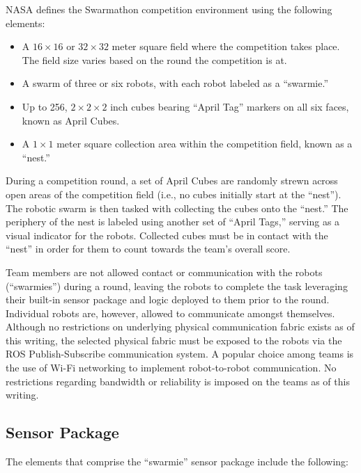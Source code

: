 \documentclass[sigconf,authordraft]{acmart}
\begin{document}
NASA defines the Swarmathon competition environment using the following
elements:

\begin{itemize}
  \item A $16 \times 16$ or $32 \times 32$ meter square field where the
  competition takes place. The field size varies based on the round the
  competition is at.
  \item A swarm of three or six robots, with each robot labeled as a
  ``swarmie.''
  \item Up to 256, $2 \times 2 \times 2$ inch cubes bearing ``April Tag''
  markers on all six faces, known as April Cubes.
  \item A $1 \times 1$ meter square collection area within the competition
  field, known as a ``nest.''
\end{itemize}

During a competition round, a set of April Cubes are randomly strewn across
open areas of the competition field (i.e., no cubes initially start at
the ``nest''). The robotic swarm is then tasked with collecting the cubes onto
the ``nest.'' The periphery of the nest is labeled using another set of ``April
Tags,'' serving as a visual indicator for the robots. Collected cubes must be
in contact with the ``nest'' in order for them to count towards the team's
overall score.

Team members are not allowed contact or communication with the robots
(``swarmies'') during a round, leaving the robots to complete the task
leveraging their built-in sensor package and logic deployed to them prior to the
round. Individual robots are, however, allowed to communicate amongst
themselves. Although no restrictions on underlying physical communication fabric
exists as of this writing, the selected physical fabric must be exposed to the
robots via the ROS Publish-Subscribe communication system. A popular choice among teams is the use of Wi-Fi networking to implement robot-to-robot communication. No restrictions regarding bandwidth or reliability is imposed on the teams as of this writing.

\subsection{Sensor Package}\label{subsec:sensors}
The elements that comprise the ``swarmie'' sensor package include the
following:
\end{document}

